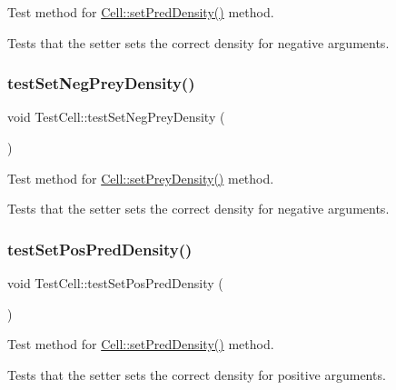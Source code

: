 Test method for \hyperlink{class_cell_adfd2fa8a4b91e18ca6195f34dbf00546}{Cell\+::set\+Pred\+Density()} method. 

Tests that the setter sets the correct density for negative arguments. \mbox{\label{class_test_cell_af9f307b147e9b64f143e21f263d35be3}} 
\subsubsection{\texorpdfstring{test\+Set\+Neg\+Prey\+Density()}{testSetNegPreyDensity()}}
{\footnotesize\ttfamily void Test\+Cell\+::test\+Set\+Neg\+Prey\+Density (\begin{DoxyParamCaption}{ }\end{DoxyParamCaption})\hspace{0.3cm}{\ttfamily [protected]}}



Test method for \hyperlink{class_cell_afd3a85027b67dfd4295e2e50253c1058}{Cell\+::set\+Prey\+Density()} method. 

Tests that the setter sets the correct density for negative arguments. \mbox{\label{class_test_cell_abd30bc743823cff506c028decf6fa839}} 
\subsubsection{\texorpdfstring{test\+Set\+Pos\+Pred\+Density()}{testSetPosPredDensity()}}
{\footnotesize\ttfamily void Test\+Cell\+::test\+Set\+Pos\+Pred\+Density (\begin{DoxyParamCaption}{ }\end{DoxyParamCaption})\hspace{0.3cm}{\ttfamily [protected]}}



Test method for \hyperlink{class_cell_adfd2fa8a4b91e18ca6195f34dbf00546}{Cell\+::set\+Pred\+Density()} method. 

Tests that the setter sets the correct density for positive arguments. \mbox{\label{class_test_cell_a0dd309da919dfb0e58dd371bbadffae5}} 
